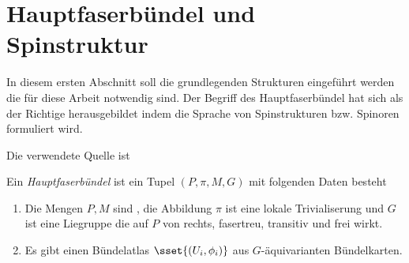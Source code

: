 






%
\section{Hauptfaserbündel und Spinstruktur}

In diesem ersten Abschnitt soll die grundlegenden Strukturen eingeführt 
werden die für diese Arbeit notwendig sind. Der Begriff des Hauptfaserbündel hat sich als der Richtige herausgebildet indem die Sprache von Spinstrukturen bzw. Spinoren formuliert wird.

Die verwendete Quelle ist \cite[vgl]{baum09}

\begin{Def}[Hauptfaserbündel]
	Ein \textit{Hauptfaserbündel} ist ein Tupel $(P,\pi,M,G)$ mit folgenden Daten besteht
	\begin{enumerate}[1)]
		\item Die Mengen $P,M$ sind \mfgen, die Abbildung $\pi$ ist eine lokale Trivialiserung und $G$ ist eine Liegruppe
		die auf $P$ von rechts, fasertreu, transitiv und frei wirkt.
		\item Es gibt einen Bündelatlas $\sset{(U_i,\phi_i)}$ aus $G$-äquivarianten Bündelkarten. 
	\end{enumerate}		
\end{Def}


